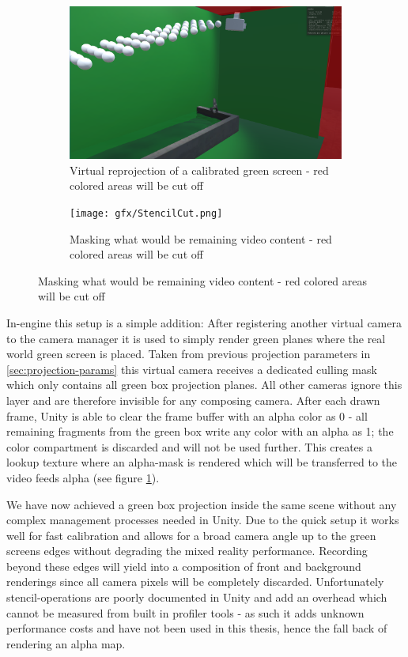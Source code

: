 \begin{figure}[htbp]
	\caption{Virtual projection and photo of VR actor - note: in-engine 
	screenshot and photos were taken shortly apart and therefore don't fit 
	exactly}
	\label{fig:stencil:projection}
	\begin{subfigure}[t]{.45\textwidth}
		\centering
		\includegraphics[width=\textwidth]{gfx/StencilProjection.png}
		\caption{Virtual reprojection of a calibrated green screen - red 
		colored areas will be cut off}
	\end{subfigure}
	\begin{subfigure}[t]{.45\textwidth}
		\centering
		\texttt{[image: gfx/StencilCut.png]}
		\caption{Masking what would be remaining video content - red colored 
		areas will be cut off}
	\end{subfigure}
	\label{fig:virtual-proj-stencil}
\end{figure}

In-engine this setup is a simple addition: After registering another virtual 
camera to the camera manager it is used to simply render green planes where the 
real world green screen is placed. Taken from previous projection parameters in 
\ref{sec:projection-params} this virtual camera receives a dedicated culling 
mask which only contains all green box projection planes. All other cameras 
ignore this layer and are therefore invisible for any composing camera. After 
each drawn frame, Unity is able to clear the frame buffer with an alpha color 
as 0 - all remaining fragments from the green box write any color with an alpha 
as 1; the color compartment is discarded and will not be used further. This 
creates a lookup texture where an alpha-mask is rendered which will be 
transferred to the video feeds alpha (see figure 
\ref{fig:virtual-proj-stencil}).

We have now achieved a green box projection inside the same scene without any 
complex management processes needed in Unity. Due to the quick setup it works 
well for fast calibration and allows for a broad camera angle up to the green 
screens edges without degrading the mixed reality performance. Recording beyond 
these edges will yield into a composition of front and background renderings 
since all camera pixels will be completely discarded.
\newline
Unfortunately stencil-operations are poorly documented in Unity and add an 
overhead which cannot be measured from built in profiler tools - as such it 
adds unknown performance costs and have not been used in this thesis, hence the 
fall back of rendering an alpha map.